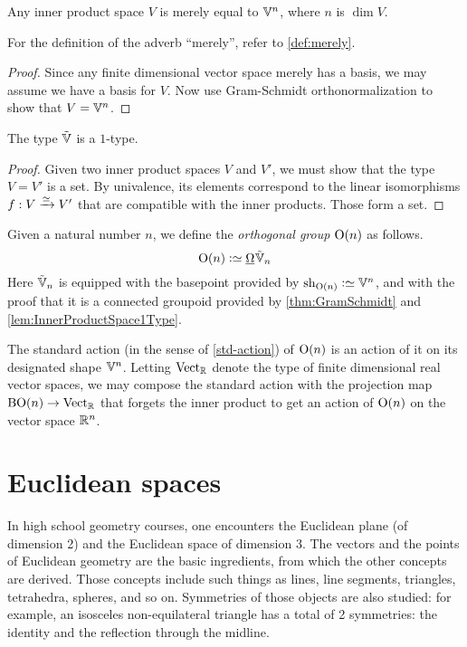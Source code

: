 \begin{theorem}\label{thm:GramSchmidt}
  Any inner product space $V$ is merely equal to $\mathbb V^n$, where $n$ is $\dim V$.
\end{theorem}

For the definition of the adverb ``merely'', refer to \cref{def:merely}.

\begin{proof}
  Since any finite dimensional vector space merely has a basis, we may assume
  we have a basis for $V$.  Now use Gram-Schmidt orthonormalization to show
  that $V = \mathbb V^n$.
\end{proof}

\begin{lemma}\label{lem:InnerProductSpace1Type}
  The type ${\tilde {\mathbb V}}$ is a $1$-type.
\end{lemma}

\begin{proof}
  Given two inner product spaces $V$ and $V'$, we must show that the type
  $V=V'$ is a set.  By univalence, its elements correspond to the linear
  isomorphisms $f : V \xrightarrow {\simeq} V'$ that are compatible with the
  inner products.  Those form a set.
\end{proof}

\begin{definition}\label{def:OrthogonalGroup}
  Given a natural number $n$, we define the {\em orthogonal group} $\mathrm{O}(n)$
  as follows.
  $$\OrthGp n \defeq \mkgroup \OS_n$$
  Here ${\tilde {\mathbb V}}_n$ is equipped with the basepoint provided by $\sh_{\OrthGp n} \defeq \VV^n$, and with the
  proof that it is a connected groupoid provided by \cref{thm:GramSchmidt} and
  \cref{lem:InnerProductSpace1Type}.
\end{definition}

The standard action (in the sense of \cref{std-action}) of $\mathrm{O}(n)$ is an
action of it on its designated shape $\mathbb V^n$.  Letting $\mathrm{Vect}_{\mathbb{R}}$ denote
the type of finite dimensional real vector spaces, we may compose the standard
action with the projection map $\mathrm{B} \mathrm{O}(n) \to \mathrm{Vect}_{\mathbb{R}}$ that
forgets the inner product to get an action of $\mathrm{O}(n)$ on the vector space
$\mathbb{R}^n$.

\section{Euclidean spaces}

In high school geometry courses, one encounters the Euclidean plane (of
dimension 2) and the Euclidean space of dimension 3.  The vectors and the
points of Euclidean geometry are the basic ingredients, from which the other
concepts are derived.  Those concepts include such things as lines, line
segments, triangles, tetrahedra, spheres, and so on.  Symmetries of those
objects are also studied: for example, an isosceles non-equilateral triangle has
a total of 2 symmetries: the identity and the reflection through the midline.

